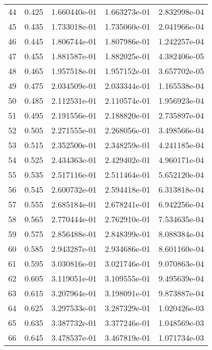 \begin{table}[ht]
\begin{tabular}{rcccc}
    44 &  0.425 &    1.660440e-01 &    1.663273e-01  &     2.832998e-04\\ 
    45 &  0.435 &    1.733018e-01 &    1.735060e-01  &     2.041966e-04\\ 
    46 &  0.445 &    1.806744e-01 &    1.807986e-01  &     1.242257e-04\\ 
    47 &  0.455 &    1.881587e-01 &    1.882025e-01  &     4.382406e-05\\ 
    48 &  0.465 &    1.957518e-01 &    1.957152e-01  &     3.657702e-05\\ 
    49 &  0.475 &    2.034509e-01 &    2.033344e-01  &     1.165538e-04\\ 
    50 &  0.485 &    2.112531e-01 &    2.110574e-01  &     1.956923e-04\\ 
    51 &  0.495 &    2.191556e-01 &    2.188820e-01  &     2.735897e-04\\ 
    52 &  0.505 &    2.271555e-01 &    2.268056e-01  &     3.498566e-04\\ 
    53 &  0.515 &    2.352500e-01 &    2.348259e-01  &     4.241185e-04\\ 
    54 &  0.525 &    2.434363e-01 &    2.429402e-01  &     4.960171e-04\\ 
    55 &  0.535 &    2.517116e-01 &    2.511464e-01  &     5.652120e-04\\ 
    56 &  0.545 &    2.600732e-01 &    2.594418e-01  &     6.313818e-04\\ 
    57 &  0.555 &    2.685184e-01 &    2.678241e-01  &     6.942256e-04\\ 
    58 &  0.565 &    2.770444e-01 &    2.762910e-01  &     7.534635e-04\\ 
    59 &  0.575 &    2.856488e-01 &    2.848399e-01  &     8.088384e-04\\ 
    60 &  0.585 &    2.943287e-01 &    2.934686e-01  &     8.601160e-04\\ 
    61 &  0.595 &    3.030816e-01 &    3.021746e-01  &     9.070863e-04\\ 
    62 &  0.605 &    3.119051e-01 &    3.109555e-01  &     9.495639e-04\\ 
    63 &  0.615 &    3.207964e-01 &    3.198091e-01  &     9.873887e-04\\ 
    64 &  0.625 &    3.297533e-01 &    3.287329e-01  &     1.020426e-03\\ 
    65 &  0.635 &    3.387732e-01 &    3.377246e-01  &     1.048569e-03\\ 
    66 &  0.645 &    3.478537e-01 &    3.467819e-01  &     1.071734e-03\\ 

\end{tabular}
\end{table}
